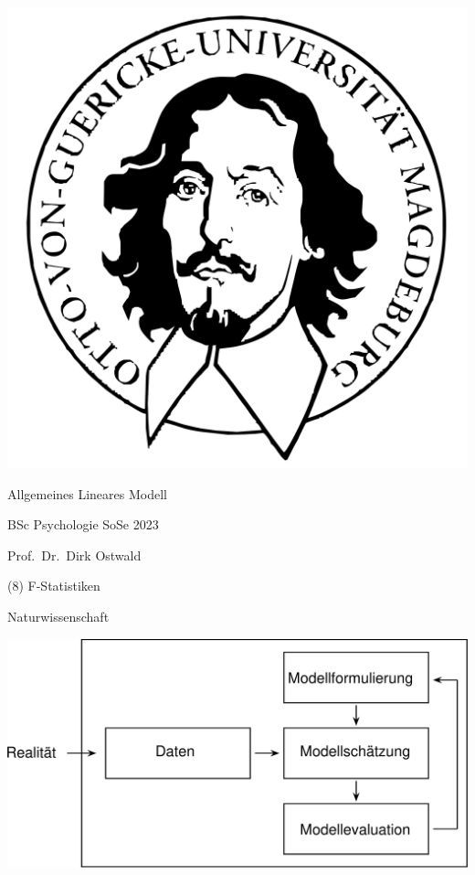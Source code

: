\documentclass[
  8pt,
  ignorenonframetext,
]{beamer}
\author{}
\date{\vspace{-2.5em}}
\begin{document}
\begin{frame}[plain]{}
\protect\hypertarget{section}{}
\center

\begin{center}\includegraphics[width=0.2\linewidth]{8_Abbildungen/alm_8_otto} \end{center}

\vspace{2mm}

\huge

Allgemeines Lineares Modell \vspace{6mm}

\large

BSc Psychologie SoSe 2023

\vspace{6mm}
\normalsize

Prof.~Dr.~Dirk Ostwald
\end{frame}

\begin{frame}[plain]{}
\protect\hypertarget{section-1}{}
\center
\huge
\vfill

\noindent (8) F-Statistiken \vfill
\end{frame}

\begin{frame}{}
\protect\hypertarget{section-2}{}
\large

Naturwissenschaft \vspace{7mm}

\begin{center}\includegraphics[width=0.9\linewidth]{8_Abbildungen/alm_8_wissenschaft} \end{center}
\end{frame}
\end{document}
